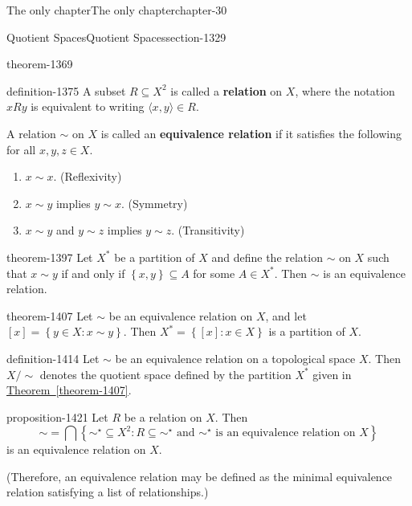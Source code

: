 \documentclass[oneside,10pt,]{book}
\newcommand{\terminology}[1]{\textbf{#1}}
\newcommand{\tuple}[1]{\langle #1 \rangle}
\newcommand{\setBuilder}[2]{\left\{#1:#2\right\}}
\newcommand{\setList}[1]{\left\{#1\right\}}
\begin{document}
\begin{chapterptx}{The only chapter}{}{The only chapter}{}{}{chapter-30}
\begin{sectionptx}{Quotient Spaces}{}{Quotient Spaces}{}{}{section-1329}
\begin{theorem}{}{}{theorem-1369}
\end{theorem}
\begin{definition}{}{definition-1375}%
\hypertarget{p-1376}{}%
A subset \(R\subseteq X^2\) is called a \terminology{relation} on \(X\), where the notation \(xRy\) is equivalent to writing \(\tuple{x,y}\in R\).%
\par
\hypertarget{p-1382}{}%
A relation \(\sim\) on \(X\) is called an \terminology{equivalence relation} if it satisfies the following for all \(x,y,z\in X\).%
\leavevmode%
\begin{enumerate}
\item\hypertarget{li-1388}{}\(x\sim x\). (Reflexivity)%
\item\hypertarget{li-1390}{}\(x\sim y\) implies \(y\sim x\). (Symmetry)%
\item\hypertarget{li-1393}{}\(x\sim y\) and \(y\sim z\) implies \(y\sim z\). (Transitivity)%
\end{enumerate}
\end{definition}
\begin{theorem}{}{}{theorem-1397}%
\hypertarget{p-1398}{}%
Let \(X^*\) be a partition of \(X\) and define the relation \(\sim\) on \(X\) such that \(x\sim y\) if and only if \(\setList{x,y}\subseteq A\) for some \(A\in X^*\). Then \(\sim\) is an equivalence relation.%
\end{theorem}
\begin{theorem}{}{}{theorem-1407}%
\hypertarget{p-1408}{}%
Let \(\sim\) be an equivalence relation on \(X\), and let \([x]=\setBuilder{y\in X}{x\sim y}\). Then \(X^*=\setBuilder{[x]}{x\in X}\) is a partition of \(X\).%
\end{theorem}
\begin{definition}{}{definition-1414}%
\hypertarget{p-1415}{}%
Let \(\sim\) be an equivalence relation on a topological space \(X\). Then \(X/\sim\) denotes the quotient space defined by the partition \(X^*\) given in \hyperref[theorem-1407]{Theorem~\ref{theorem-1407}}.%
\end{definition}
\begin{proposition}{}{}{proposition-1421}%
\hypertarget{p-1422}{}%
Let \(R\) be a relation on \(X\). Then%
\begin{equation*}
\sim=\bigcap\setBuilder{\sim^\star\subseteq X^2}{R\subseteq\sim^\star\text{ and }\sim^\star
\text{ is an equivalence relation on }X}
\end{equation*}
is an equivalence relation on \(X\).%
\par
\hypertarget{p-1427}{}%
(Therefore, an equivalence relation may be defined as the minimal equivalence relation satisfying a list of relationships.)%

\end{proposition}
\end{sectionptx}
\end{chapterptx}
\end{document}
